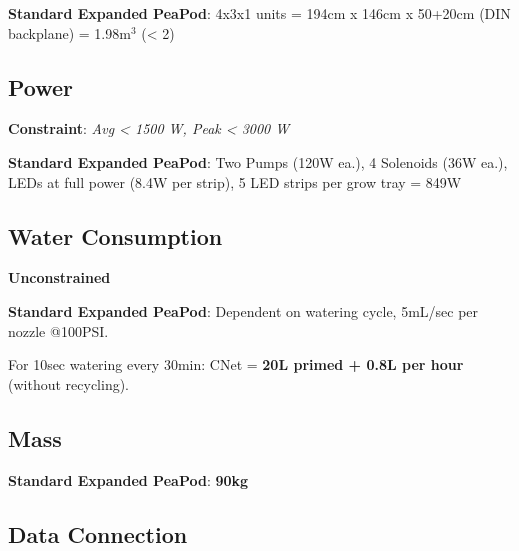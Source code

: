 \documentclass{../tex/report}
\begin{document}
\textbf{Standard Expanded PeaPod}: 4x3x1 units = 194cm x 146cm x 50+20cm (DIN backplane) = 1.98m${}^3$ (< 2)


\subsection{Power}

\textbf{Constraint}: \textit{Avg < 1500 W, Peak < 3000 W}

\textbf{Standard Expanded PeaPod}: Two Pumps (120W ea.), 4 Solenoids (36W ea.), LEDs at full power (8.4W per strip), 5 LED strips per grow tray = 849W


\subsection{Water Consumption}

\textbf{Unconstrained}


\textbf{Standard Expanded PeaPod}: Dependent on watering cycle, 5mL/sec per nozzle @100PSI.

For 10sec watering every 30min: CNet = \textbf{20L primed + 0.8L per hour} (without recycling).

\subsection{Mass}


\textbf{Standard Expanded PeaPod}: \textbf{90kg}

\subsection{Data Connection}
\end{document}
